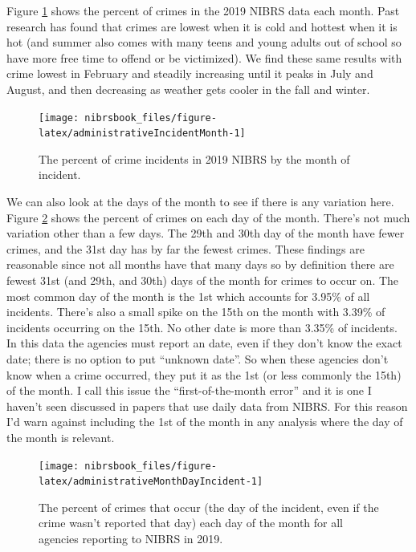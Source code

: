 \documentclass[
  12pt,
  openany]{book}
\begin{document}
Figure \ref{fig:administrativeIncidentMonth} shows the percent of crimes in the 2019 NIBRS data each month. Past research has found that crimes are lowest when it is cold and hottest when it is hot (and summer also comes with many teens and young adults out of school so have more free time to offend or be victimized). We find these same results with crime lowest in February and steadily increasing until it peaks in July and August, and then decreasing as weather gets cooler in the fall and winter.

\begin{figure}

{\centering \texttt{[image: nibrsbook\_files/figure-latex/administrativeIncidentMonth-1]} 

}

\caption{The percent of crime incidents in 2019 NIBRS by the month of incident.}\label{fig:administrativeIncidentMonth}
\end{figure}

We can also look at the days of the month to see if there is any variation here. Figure \ref{fig:administrativeMonthDayIncident} shows the percent of crimes on each day of the month. There's not much variation other than a few days. The 29th and 30th day of the month have fewer crimes, and the 31st day has by far the fewest crimes. These findings are reasonable since not all months have that many days so by definition there are fewest 31st (and 29th, and 30th) days of the month for crimes to occur on. The most common day of the month is the 1st which accounts for 3.95\% of all incidents. There's also a small spike on the 15th on the month with 3.39\% of incidents occurring on the 15th. No other date is more than 3.35\% of incidents. In this data the agencies must report an date, even if they don't know the exact date; there is no option to put ``unknown date''. So when these agencies don't know when a crime occurred, they put it as the 1st (or less commonly the 15th) of the month. I call this issue the ``first-of-the-month error'' and it is one I haven't seen discussed in papers that use daily data from NIBRS. For this reason I'd warn against including the 1st of the month in any analysis where the day of the month is relevant.

\begin{figure}

{\centering \texttt{[image: nibrsbook\_files/figure-latex/administrativeMonthDayIncident-1]} 

}

\caption{The percent of crimes that occur (the day of the incident, even if the crime wasn't reported that day) each day of the month for all agencies reporting to NIBRS in 2019.}\label{fig:administrativeMonthDayIncident}
\end{figure}
\end{document}
